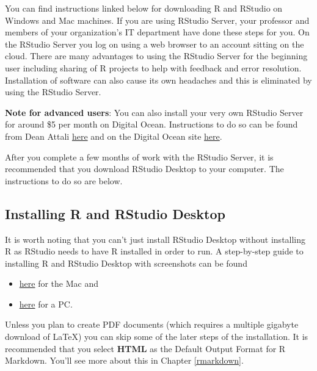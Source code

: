 \documentclass[]{tufte-book}
\providecommand{\tightlist}{%
  \setlength{\itemsep}{0pt}\setlength{\parskip}{0pt}}
\theoremstyle{definition}
\theoremstyle{definition}
\theoremstyle{remark}
\begin{document}
You can find instructions linked below for downloading R and RStudio on
Windows and Mac machines. If you are using RStudio Server, your
professor and members of your organization's IT department have done
these steps for you. On the RStudio Server you log on using a web
browser to an account sitting on the cloud. There are many advantages to
using the RStudio Server for the beginning user including sharing of R
projects to help with feedback and error resolution. Installation of
software can also cause its own headaches and this is eliminated by
using the RStudio Server.

\textbf{Note for advanced users}: You can also install your very own
RStudio Server for around \$5 per month on Digital Ocean. Instructions
to do so can be found from Dean Attali
\href{http://deanattali.com/2015/05/09/setup-rstudio-shiny-server-digital-ocean/}{here}
and on the Digital Ocean site
\href{https://www.digitalocean.com/community/tutorials/how-to-set-up-rstudio-on-an-ubuntu-cloud-server}{here}.

After you complete a few months of work with the RStudio Server, it is
recommended that you download RStudio Desktop to your computer. The
instructions to do so are below.

\subsection{Installing R and RStudio
Desktop}\label{installing-r-and-rstudio-desktop}

It is worth noting that you can't just install RStudio Desktop without
installing R as RStudio needs to have R installed in order to run. A
step-by-step guide to installing R and RStudio Desktop with screenshots
can be found

\begin{itemize}
\tightlist
\item
  \href{http://www.reed.edu/data-at-reed/software/R/r_studio.html}{here}
  for the Mac and
\item
  \href{http://www.reed.edu/data-at-reed/software/R/r_studio_pc.html}{here}
  for a PC.
\end{itemize}

Unless you plan to create PDF documents (which requires a multiple
gigabyte download of LaTeX) you can skip some of the later steps of the
installation. It is recommended that you select \textbf{HTML} as the
Default Output Format for R Markdown. You'll see more about this in
Chapter \ref{rmarkdown}.
\end{document}

